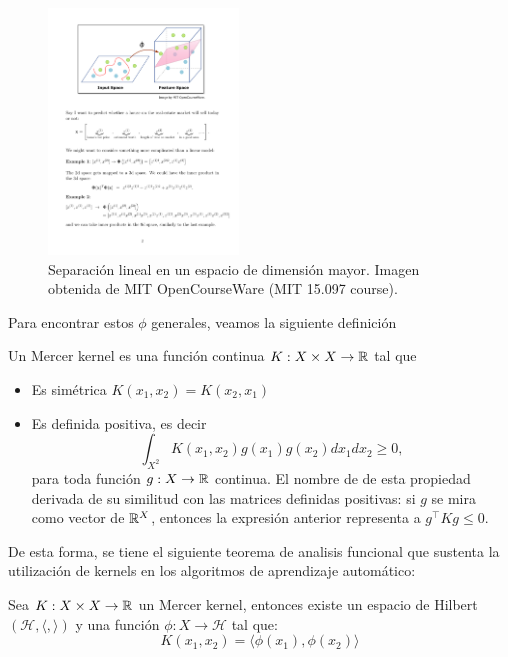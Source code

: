 \begin{figure}[ht]
    \centering
    \includegraphics[width=0.45\textwidth]{img/cap5_kernelSVM}
    \caption{Separación lineal en un espacio de dimensión mayor. Imagen obtenida de MIT OpenCourseWare (MIT 15.097 course).}
\end{figure}



\newpage

Para encontrar estos $\phi$ generales, veamos la siguiente definición
\begin{definition}
    Un Mercer kernel es una función continua $K: X\times X \to \mathbb{R}$ tal que
\begin{itemize}
    \item Es simétrica $K(x_1 , x_2 ) = K (x_2 , x_1)$
    \item Es definida positiva, es decir
    $$\int_{X^2} K(x_1, x_2)g(x_1) g(x_2) dx_1 dx_2\geq 0,$$
    para toda función $g:X\rightarrow\mathbb{R}$ continua. El nombre de de esta propiedad derivada de su similitud con las matrices definidas positivas: si $g$ se mira como vector de $\mathbb{R}^X$, entonces la expresión anterior representa a $g^\top Kg\leq 0$.
\end{itemize}

\end{definition}

De esta forma, se tiene el siguiente teorema de analisis funcional que sustenta la utilización de kernels en los algoritmos de aprendizaje automático:


\begin{theorem}
    Sea $K: X\times X \to \mathbb{R}$ un Mercer kernel, entonces existe un espacio de Hilbert $\left(\mathcal{H},\langle,\rangle\right)$ y una función $\phi: X \to \mathcal{H}$ tal que:
    \begin{equation}
    K(x_1, x_2) = \langle \phi(x_1) , \phi(x_2) \rangle
\end{equation}
\end{theorem}

